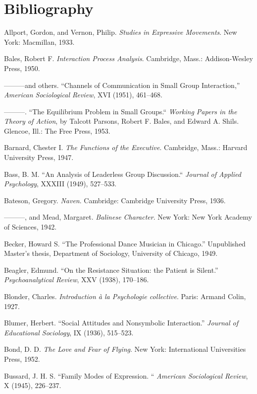 \documentclass[openany,nobib]{tufte-book}
\let\oldchapter\chapter
\def\chapter{%
  \setcounter{footnote}{0}%
  \oldchapter
}
\begin{document}
\chapter[BIBLIOGRAPHY]{Bibliography}
\label{ch:Bibliography}

\begin{hangparas}{.25in}{1} 

Allport, Gordon, and Vernon, Philip. \emph{Studies in Expressive
Movements}. New York: Macmillan, 1933.

Bales, Robert F. \emph{Interaction Process Analysis}. Cambridge, Mass.:
Addison-Wesley Press, 1950.

---------and others. ``Channels of Communication in Small Group
Interaction,'' \emph{American Sociological Review}, XVI (1951),
461--468.

---------. ``The Equilibrium Problem in Small Groups.`` \emph{Working
Papers in the Theory of Action}, by Talcott Parsons, Robert F. Bales,
and Edward A. Shils. Glencoe, Ill.: The Free Press, 1953.

Barnard, Chester I. \emph{The Functions of the Executive}. Cambridge,
Mass.: Harvard University Press, 1947.

Bass, B. M. ``An Analysis of Leaderless Group Discussion.``
\emph{Journal of Applied Psychology}, XXXIII (1949), 527--533.

Bateson, Gregory. \emph{Naven}. Cambridge: Cambridge University Press,
1936.

---------, and Mead, Margaret. \emph{Balinese Character}. New York: New
York Academy of Sciences, 1942.

Becker, Howard S. ``The Professional Dance Musician in Chicago.''
Unpublished Master's thesis, Department of Sociology, University of
Chicago, 1949.

Beagler, Edmund. ``On the Resistance Situation: the Patient is Silent.''
\emph{Psychoanalytical Review}, XXV (1938), 170--186.

Blonder, Charles. \emph{Introduction à la Psychologie collective}.
Paris: Armand Colin, 1927.

Blumer, Herbert. ``Social Attitudes and Nonsymbolic Interaction.''
\emph{Journal of Educational Sociology}, IX (1936), 515--523.

Bond, D. D. \emph{The Love and Fear of Flying}. New York: International
Universities Press, 1952.

Bussard, J. H. S. ``Family Modes of Expression. `` \emph{American
Sociological Review}, X (1945), 226--237.


\end{hangparas}
\end{document}

